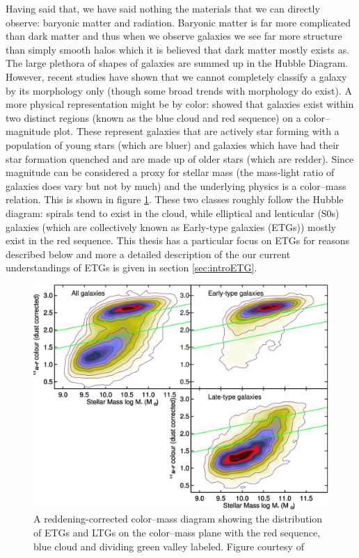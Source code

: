 Having said that, we have said nothing the materials that we can directly observe: baryonic matter and radiation. Baryonic matter is far more complicated than dark matter and thus when we observe galaxies we see far more structure than simply smooth halos which it is believed that dark matter mostly exists as. The large plethora of shapes of galaxies are summed up in the Hubble Diagram. However, recent studies have shown that we cannot completely classify a galaxy by its morphology only (though some broad trends with morphology do exist). A more physical representation might be by color: \citet{Baldry2004} showed that galaxies exist within two distinct regions (known as the blue cloud and red sequence) on a color--magnitude plot. These represent galaxies that are actively star forming with a population of young stars (which are bluer) and galaxies which have had their star formation quenched and are made up of older stars (which are redder). Since magnitude can be considered a proxy for stellar mass (the mass-light ratio of galaxies does vary but not by much) and the underlying physics is a color--mass relation. This is shown in figure \ref{fig:colorMass}. These two classes roughly follow the Hubble diagram: spirals tend to exist in the cloud, while elliptical and lenticular (S0s) galaxies (which are collectively known as Early-type galaxies (ETGs)) mostly exist in the red sequence. This thesis has a particular focus on ETGs for reasons described below and more a detailed description of the our current understandings of ETGs is given in section \ref{sec:introETG}. 

\begin{figure}
	\centering
	\includegraphics[width=\textwidth]{introduction/colorRedCorr_mass.jpeg}
	\caption[Color--Mass diagram]{A reddening-corrected color--mass diagram showing the distribution of ETGs and LTGs on the color--mass plane with the red sequence, blue cloud and dividing green valley labeled. Figure courtesy of \citet{Schawinski2014}}
	\label{fig:colorMass}
\end{figure}

